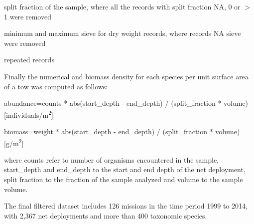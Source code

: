 \documentclass[letterpaper,portrait,12pt]{scrartcl}
\numberwithin{equation}{section}		%
\numberwithin{figure}{section}			%
\numberwithin{table}{section}				%
\begin{document}
\begin{flushleft}

	split fraction of the sample, where all the records with split fraction NA, 0 or $>$1 were removed 

\end{flushleft}


\begin{flushleft}

	minimum and maximum sieve for dry weight records, where records NA sieve were removed

\end{flushleft}


\begin{flushleft}

	repeated records 

\end{flushleft}








Finally the numerical and biomass density for each species per unit surface area of a tow was computed as follows: 









abundance=counts * abs(start\_depth - end\_depth) / (split\_fraction * volume)   [individuals/m\textsuperscript{2}]









biomass=weight * abs(start\_depth - end\_depth) / (split\_fraction * volume)         [g/m\textsuperscript{2}]









where counts refer to number of organisms encountered in the sample, start\_depth and end\_depth to the start and end depth of the net deployment, split fraction to the fraction of the sample analyzed and volume to the sample volume.









The final filtered dataset includes 126 missions in the time period 1999 to 2014, with 2,367 net deployments and more than 400 taxonomic species. 
\end{document}
